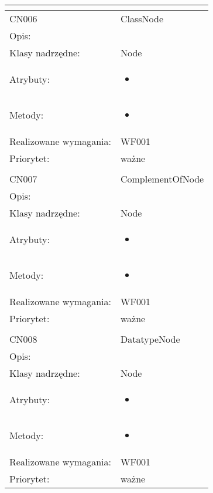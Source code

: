 \documentclass[a4paper,10pt]{article}
\begin{document}
\begin{center}
\begin{longtable}{|m{3cm}|m{9cm}|}
\multicolumn{2}{c}{} \\
 \hline

CN006 & ClassNode \\ \hline
Opis: &     \\ \hline
Klasy nadrzędne: & Node     \\ \hline
Atrybuty: & \begin{itemize}
 \item 
\end{itemize}
 \\ \hline
Metody: & \begin{itemize}
 \item 
\end{itemize}
  \\ \hline
Realizowane wymagania: & WF001 \\ \hline
Priorytet: & ważne  \\ \hline

\multicolumn{2}{c}{} \\
 \hline

CN007 & ComplementOfNode \\ \hline
Opis: &     \\ \hline
Klasy nadrzędne: & Node     \\ \hline
Atrybuty: & \begin{itemize}
 \item 
\end{itemize}
 \\ \hline
Metody: & \begin{itemize}
 \item 
\end{itemize}
  \\ \hline
Realizowane wymagania: & WF001 \\ \hline
Priorytet: & ważne  \\ \hline

\multicolumn{2}{c}{} \\
 \hline

CN008 & DatatypeNode \\ \hline
Opis: &     \\ \hline
Klasy nadrzędne: & Node     \\ \hline
Atrybuty: & \begin{itemize}
 \item 
\end{itemize}
 \\ \hline
Metody: & \begin{itemize}
 \item 
\end{itemize}
  \\ \hline
Realizowane wymagania: & WF001 \\ \hline
Priorytet: & ważne  \\ \hline


\end{longtable}
\end{center}
\end{document}
